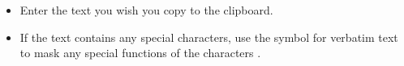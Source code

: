 \begin{itemize}
\item Enter the text you wish you copy to the clipboard.
\item If the text contains any special characters, use the symbol for verbatim text to mask any special functions of the characters . 
\end{itemize}
